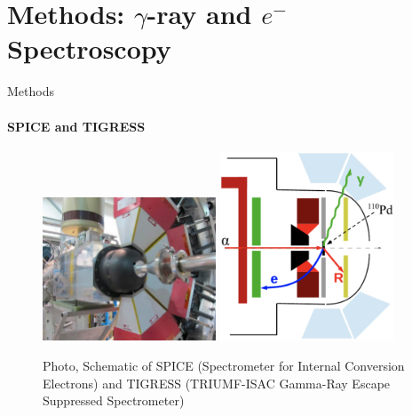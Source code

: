 \documentclass{beamer}
\begin{document}


\section{Methods: $\gamma$-ray and $e^-$ Spectroscopy}




\begin{frame}{Methods}
\framesubtitle{SPICE and TIGRESS}
\begin{figure}[!hht]
  \centering
  \includegraphics[width=0.46\textwidth, keepaspectratio]{SPICE.png}
  \hspace{0.3cm}
  \includegraphics[width=0.46\textwidth, keepaspectratio]{SPICESchem.png}
  \caption{Photo, Schematic of SPICE (Spectrometer for Internal Conversion Electrons) and
TIGRESS (TRIUMF-ISAC Gamma-Ray Escape Suppressed Spectrometer)}
\end{figure}
\end{frame}
\end{document}
